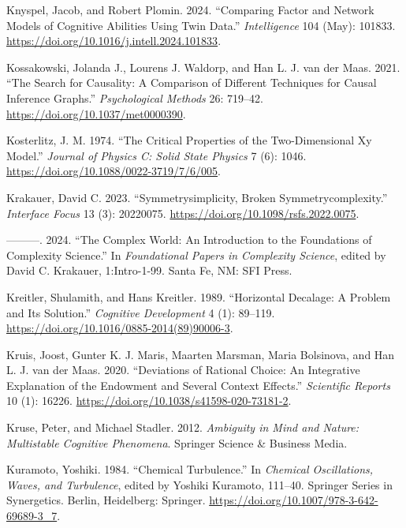 \documentclass[
  a4paper,
  DIV=11,
  numbers=noendperiod,
  oneside]{scrreprt}
\newlength{\cslhangindent}
\newenvironment{CSLReferences}[2] %
 {\begin{list}{}{%
  \setlength{\itemindent}{0pt}
  \setlength{\leftmargin}{0pt}
  \setlength{\parsep}{0pt}
  \ifodd #1
   \setlength{\leftmargin}{\cslhangindent}
   \setlength{\itemindent}{-1\cslhangindent}
  \fi
  \setlength{\itemsep}{#2\baselineskip}}}
 {\end{list}}
\begin{document}
\begin{CSLReferences}{1}{0}
Knyspel, Jacob, and Robert Plomin. 2024. {``Comparing Factor and Network
Models of Cognitive Abilities Using Twin Data.''} \emph{Intelligence}
104 (May): 101833. \url{https://doi.org/10.1016/j.intell.2024.101833}.

Kossakowski, Jolanda J., Lourens J. Waldorp, and Han L. J. van der Maas.
2021. {``The Search for Causality: {A} Comparison of Different
Techniques for Causal Inference Graphs.''} \emph{Psychological Methods}
26: 719--42. \url{https://doi.org/10.1037/met0000390}.

Kosterlitz, J. M. 1974. {``The Critical Properties of the
Two-Dimensional Xy Model.''} \emph{Journal of Physics C: Solid State
Physics} 7 (6): 1046. \url{https://doi.org/10.1088/0022-3719/7/6/005}.

Krakauer, David C. 2023. {``Symmetry\textendash simplicity, Broken
Symmetry\textendash complexity.''} \emph{Interface Focus} 13 (3):
20220075. \url{https://doi.org/10.1098/rsfs.2022.0075}.

---------. 2024. {``The Complex World: An Introduction to the
Foundations of Complexity Science.''} In \emph{Foundational Papers in
Complexity Science}, edited by David C. Krakauer, 1:Intro-1-99. Santa
Fe, NM: SFI Press.

Kreitler, Shulamith, and Hans Kreitler. 1989. {``Horizontal Decalage:
{A} Problem and Its Solution.''} \emph{Cognitive Development} 4 (1):
89--119. \url{https://doi.org/10.1016/0885-2014(89)90006-3}.

Kruis, Joost, Gunter K. J. Maris, Maarten Marsman, Maria Bolsinova, and
Han L. J. van der Maas. 2020. {``Deviations of Rational Choice: An
Integrative Explanation of the Endowment and Several Context Effects.''}
\emph{Scientific Reports} 10 (1): 16226.
\url{https://doi.org/10.1038/s41598-020-73181-2}.

Kruse, Peter, and Michael Stadler. 2012. \emph{Ambiguity in {Mind} and
{Nature}: {Multistable Cognitive Phenomena}}. {Springer Science \&
Business Media}.

Kuramoto, Yoshiki. 1984. {``Chemical {Turbulence}.''} In \emph{Chemical
{Oscillations}, {Waves}, and {Turbulence}}, edited by Yoshiki Kuramoto,
111--40. Springer {Series} in {Synergetics}. {Berlin, Heidelberg}:
{Springer}. \url{https://doi.org/10.1007/978-3-642-69689-3_7}.


\end{CSLReferences}
\end{document}
